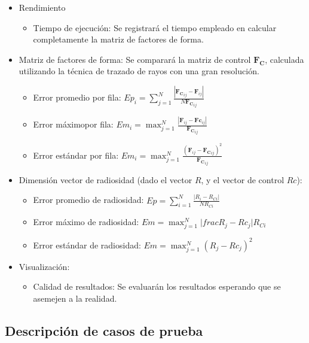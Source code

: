 \begin{itemize}
	\item Rendimiento
		\begin{itemize}
			\item Tiempo de ejecución: Se registrará el tiempo empleado en calcular completamente la matriz de factores de forma.
		\end{itemize}
	\item Matriz de factores de forma: Se comparará la matriz de control $\mathbf{F_{C}}$, calculada utilizando la técnica de trazado de rayos con una gran resolución.
		\begin{itemize}
			\item Error promedio por fila: $Ep_{i} = \sum_{j=1}^{N} \frac{|\mathbf{F_{C}}_{ij} -\mathbf{F}_{ij}|}{N \mathbf{F_{C}}_{ij}}$
			\item Error máximopor fila: $Em_{i} = \max_{j=1}^{N}\frac{|\mathbf{F}_{ij} -\mathbf{Fc}_{ij}|}{\mathbf{F_{C}}_{ij}}$
			\item Error estándar por fila: $Em_{i} = \max_{j=1}^{N}\frac{(\mathbf{F}_{ij} -\mathbf{F_{C}}_{ij})^{2}}{\mathbf{F_{C}}_{ij}}$
		\end{itemize}
	\item Dimensión vector de radiosidad (dado el vector $R$, y el vector de control $Rc$):
	\begin{itemize}
		\item Error promedio de radiosidad: $Ep = \sum_{i=1}^{N} \frac{|R_{i}-R_{Ci}|}{N R_{Ci}}$
		\item Error máximo de radiosidad: $Em = \max_{j=1}^{N}|frac{R_{j} -Rc_{j}|}{R_{Ci}}$
		\item Error estándar de radiosidad: $Em = \max_{j=1}^{N}(R_{j} -Rc_{j})^{2}$
	\end{itemize}
\item Visualización:
	\begin{itemize}
		\item Calidad de resultados: Se evaluarán los resultados esperando que se asemejen a la realidad.
	\end{itemize}
\end{itemize}

\subsection{Descripción de casos de prueba}

